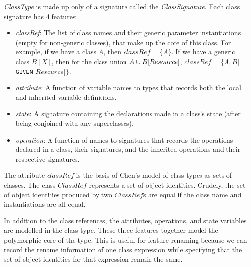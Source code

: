 \vspace{2mm} {\em ClassType} is made up only of a signature called
the {\em ClassSignature}. Each class signature has 4 features:
\begin{itemize}
  \item {\em classRef}: The list of class names and their generic
    parameter instantiations (empty for non-generic classes), that
    make up the core of this class. For example, if we have a class
    $A$, then $classRef = \{ A \}$. If we have a generic class $B[X]$,
    then for the class union $A \classuni B[Resource]$,
    $classRef = \{ A, B[${\tt GIVEN} $Resource]\}$.
  \item {\em attribute}: A function of variable names to types that records
    both the local and inherited variable definitions.
  \item {\em state}: A signature containing the declarations made in a
    class's state (after being conjoined with any superclasses).
  \item {\em operation}: A function of names to signatures that
    records the operations declared in a class, their signatures, and
    the inherited operations and their respective signatures.
\end{itemize}

The attribute $classRef$ is the basis of Chen's model of class types
as sets of classes. The class $ClassRef$ represents a set of object
identities. Crudely, the set of object identities produced by two
$ClassRef$s are equal if the class name and
instantiations are all equal.

In addition to the class references, the attributes, operations, and
state variables are modelled in the class type. These three features
together model the polymorphic core of the type. This is useful for
feature renaming because we can record the rename information of one
class expression while specifying that the set of object identities
for that expression remain the same.


